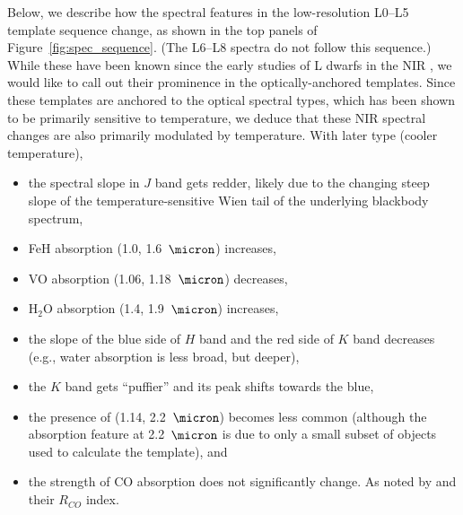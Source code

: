 \documentclass[12pt,preprint]{aastex}
\begin{document}

Below, we describe how the spectral features in the low-resolution L0--L5 template sequence change, as shown in the top panels of Figure~\ref{fig:spec_sequence}. (The L6--L8 spectra do not follow this sequence.)
While these have been known since the early studies of L dwarfs in the NIR \citep{Testi01,Geballe02}, we would like to call out their prominence in the optically-anchored templates.
Since these templates are anchored to the optical spectral types, which has been shown to be primarily sensitive to temperature, we deduce that these NIR spectral changes are also primarily modulated by temperature.
With later type (cooler temperature), 
\begin{itemize}
\item the spectral slope in $J$ band gets redder, likely due to the changing steep slope of the temperature-sensitive Wien tail of the underlying blackbody spectrum,
\item FeH absorption (1.0, 1.6~$\micron$) increases,
\item VO absorption (1.06, 1.18~$\micron$) decreases,
\item H$_2$O absorption (1.4, 1.9~$\micron$) increases,
\item the slope of the blue side of $H$ band and the red side of $K$ band decreases (e.g., water absorption is less broad, but deeper), 
\item the $K$ band gets ``puffier'' and its peak shifts towards the blue,
\item the presence of  (1.14, 2.2~$\micron$) becomes less common (although the absorption feature at 2.2~$\micron$ is due to only a small subset of objects used to calculate the template), and
\item the strength of CO absorption does not significantly change. As noted by \citet{Reid01_NIR} and their $R_{CO}$ index.
\end{itemize}
\end{document}
